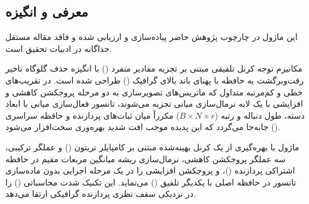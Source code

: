 \subsection{معرفی و انگیزه}
این ماژول در چارچوب پژوهش حاضر پیاده‌سازی و ارزیابی شده و فاقد مقاله مستقل جداگانه در ادبیات تحقیق است.

مکانیزم توجه کرنل تلفیقی مبتنی بر تجزیه مقادیر منفرد () با انگیزه حذف گلوگاه تاخیر رفت‌وبرگشت به حافظه با پهنای باند بالای گرافیک () طراحی شده است. در تقریب‌های خطی و کم‌مرتبه متداول که ماتریس‌های تصویرسازی به دو مرحله پروجکشن کاهشی و افزایشی با یک لایه نرمال‌سازی میانی تجزیه می‌شوند، تانسور فعال‌سازی میانی با ابعاد دسته، طول دنباله و رتبه ($B \times N \times r$) مکرراً میان ثبات‌های پردازنده و حافظه سراسری () جابه‌جا می‌گردد که این پدیده موجب افت شدید بهره‌وری سخت‌افزار می‌شود.

ماژول  با بهره‌گیری از یک کرنل بهینه‌شده مبتنی بر کامپایلر تریتون () و عملگر ترکیبی، سه عملگر پروجکشن کاهشی، نرمال‌سازی ریشه میانگین مربعات مقیم در حافظه اشتراکی پردازنده ()، و پروجکشن افزایشی را در یک مرحله اجرایی بدون ماده‌سازی تانسور در حافظه اصلی با یکدیگر تلفیق () می‌نماید. این تکنیک شدت محاسباتی () را در نزدیکی سقف نظری پردازنده گرافیکی ارتقا می‌دهد.
